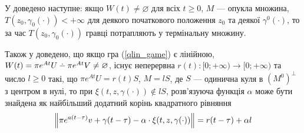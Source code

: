 У \cite{6} доведено наступне: якщо $W(t) \neq \varnothing$ для всіх $t\geq 0$,
$M$ --- опукла множина, $T(z_0, \gamma_0(\cdot)) < +\infty$ для деякого початкового положення
$z_0$ та деякої $\gamma^0(\cdot)$, то за час $T(z_0, \gamma_0(\cdot))$ гравці потрапляють у термінальну множину.

Також у \cite{6} доведено, що якщо гра (\ref{qlin_game}) є лінійною,
$W(t) = \pi e^{At}U \setdif \pi e^{At} V \neq \varnothing$, існує неперервна 
$r(t): [0; +\infty) \to [0; +\infty)$ та число $l \geq 0$ такі, що
$\pi e^{A t}U = r(t) S$, $M = l S$, де $S$ --- одинична куля в $(M^0)^\perp$ з центром в нулі, то
при $\xi(t, z, \gamma(\cdot)) \notin l S$, розв'язуюча функція $\alpha$ може бути знайдена як найбільший додатний корінь квадратного рівняння
\begin{gather}\label{lin_res_func}
    \left\Vert \pi e^{a(t-\tau)}v + \gamma(t-\tau) - \alpha \cdot \xi(t, z, \gamma(\cdot)) \right\Vert = r(t-\tau) + \alpha l
\end{gather}

